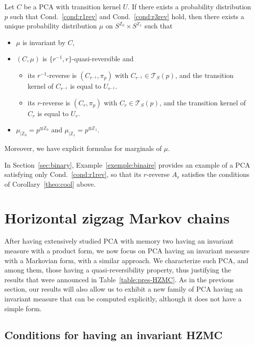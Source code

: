 \documentclass[10pt]{amsart}
\theoremstyle{definition}\newtheorem{defi}[theo]{Definition}\newtheorem{rema}[theo]{Remark}\newtheorem{exam}[theo]{Example}\newtheorem{exem}[theo]{Example}\newtheorem{nota}[theo]{Notation}
\newcounter{a}
\newcommand{\Cond}{Cond.}
\newcommand{\triang}[2]{\mathcal{T}_{#1} \left(#2 \right)}
\newcommand{\ZZ}{\mathbb{Z}}
\begin{document}
\begin{coro}\label{theo:cool}
Let $C$ be a PCA with transition kernel $U$. If there exists a probability distribution $p$ such that \Cond~\ref{cond:r1rev} and \Cond~\ref{cond:r3rev} hold, then there exists a unique probability distribution $\mu$ on $S^{\ZZ_0} \times S^{\ZZ_{1}}$ such that
\begin{itemize}
\item $\mu$ is invariant by $C$,
\item $(C,\mu)$ is $\{r^{-1},r\}$-quasi-reversible and
\begin{itemize}
\item its $r^{-1}$-reverse is $(C_{r^{-1}},\pi_p)$ with $C_{r^{-1}} \in \triang{S}{p}$, and the transition kernel of $C_{r^{-1}}$ is equal to $U_{r^{-1}}$.
\item its $r$-reverse is $(C_{r},\pi_p)$ with $C_{r} \in \triang{S}{p}$, and the transition kernel of $C_r$ is equal to $U_r$.
\end{itemize}
\item $\mu_{|\ZZ_0} = p^{\otimes \ZZ_0}$ and $\mu_{|\ZZ_{1}} = p^{\otimes \ZZ_{1}}$.
\end{itemize}
Moreover, we have explicit formulas for marginals of $\mu$.
\end{coro}

In Section~\ref{sec:binary}, Example~\ref{exemple:binaire} provides an example of a PCA satisfying only \Cond~\ref{cond:r1rev}, so that its $r$-reverse $A_r$ satisfies the conditions of Corollary~\ref{theo:cool} above.

\section{Horizontal zigzag Markov chains}\label{sec:markov}

After having extensively studied PCA with memory two having an invariant measure with a product form, we now focus on PCA having an invariant measure with a Markovian form, with a similar approach. We characterize such PCA, and among them, those having a quasi-reversibility property, thus justifying the results that were announced in Table~\ref{table:pres-HZMC}. As in the previous section, our results will also allow us to exhibit a new family of PCA having an invariant measure that can be computed explicitly, although it does not have a simple form.

\subsection{Conditions for having an invariant HZMC} \label{sec:invHZMC}
\end{document}
